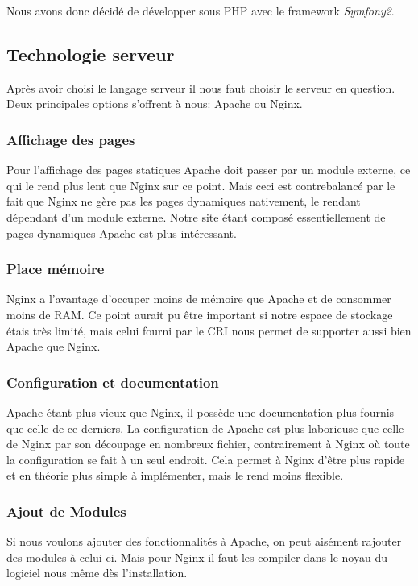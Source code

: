 Nous avons donc décidé de développer sous PHP avec le framework \textit{Symfony2}.

\subsection{Technologie serveur}

Après avoir choisi le langage serveur il nous faut choisir le serveur en question. Deux principales options s'offrent à nous: Apache ou Nginx.

\subsubsection{Affichage des pages}
Pour l'affichage des pages statiques Apache doit passer par un module externe, ce qui le rend plus lent que Nginx sur ce point.
Mais ceci est contrebalancé par le fait que Nginx ne gère pas les pages dynamiques nativement, le rendant dépendant d'un module externe.
Notre site étant composé essentiellement de pages dynamiques Apache est plus intéressant.

\subsubsection{Place mémoire}
Nginx a l'avantage d'occuper moins de mémoire que Apache et de consommer moins de RAM.
Ce point aurait pu être important si notre espace de stockage étais très limité, mais celui fourni par le CRI nous permet de supporter aussi bien Apache que Nginx.

\subsubsection{Configuration et documentation}
Apache étant plus vieux que Nginx, il possède une documentation plus fournis que celle de ce derniers.
La configuration de Apache est plus laborieuse que celle de Nginx par son découpage en nombreux fichier, contrairement à Nginx où toute la configuration se fait à un seul endroit.
Cela permet à Nginx d'être plus rapide et en théorie plus simple à implémenter, mais le rend moins flexible.

\subsubsection{Ajout de Modules}
Si nous voulons ajouter des fonctionnalités à Apache, on peut aisément rajouter des modules à celui-ci. Mais pour Nginx il faut les compiler dans le noyau du logiciel nous même dès l'installation.

